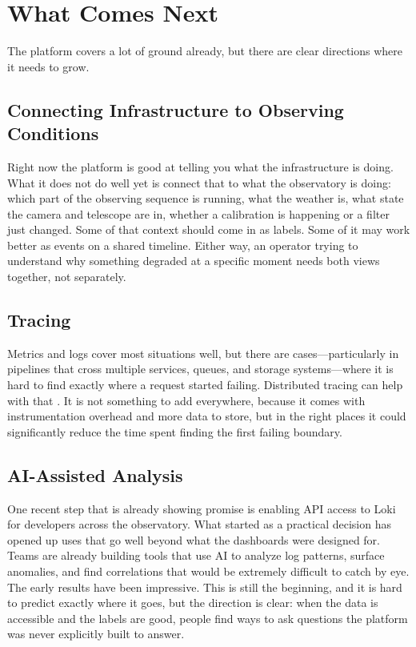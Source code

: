 \section{What Comes Next}

The platform covers a lot of ground already, but there are clear directions where it needs to grow.

\subsection{Connecting Infrastructure to Observing Conditions}

Right now the platform is good at telling you what the infrastructure is doing. What it does not
do well yet is connect that to what the observatory is doing: which part of the observing sequence
is running, what the weather is, what state the camera and telescope are in, whether a calibration
is happening or a filter just changed. Some of that context should come in as labels. Some of it
may work better as events on a shared timeline. Either way, an operator trying to understand why
something degraded at a specific moment needs both views together, not separately.

\subsection{Tracing}

Metrics and logs cover most situations well, but there are cases---particularly in pipelines that
cross multiple services, queues, and storage systems---where it is hard to find exactly where a
request started failing. Distributed tracing can help with that \cite{opentelemetry-traces}. It is
not something to add everywhere, because it comes with instrumentation overhead and more data to
store, but in the right places it could significantly reduce the time spent finding the first
failing boundary.

\subsection{AI-Assisted Analysis}

One recent step that is already showing promise is enabling API access to Loki for developers
across the observatory. What started as a practical decision has opened up uses that go well beyond
what the dashboards were designed for. Teams are already building tools that use AI to analyze log
patterns, surface anomalies, and find correlations that would be extremely difficult to catch by
eye. The early results have been impressive. This is still the beginning, and it is hard to predict
exactly where it goes, but the direction is clear: when the data is accessible and the labels are
good, people find ways to ask questions the platform was never explicitly built to answer.